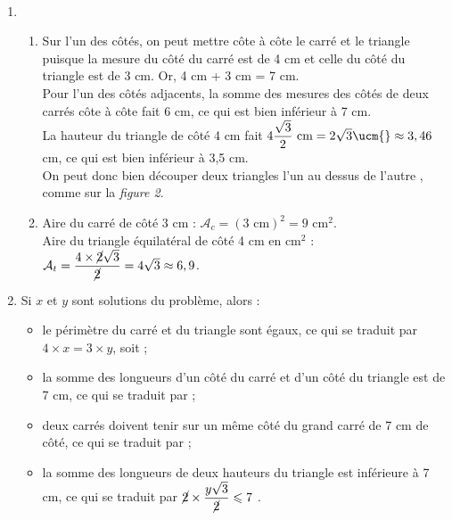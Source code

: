 \ \\ [-5mm]
\begin{enumerate}
   \item
   \begin{enumerate}
      \item Sur l'un des côtés, on peut mettre côte à côte le carré et le triangle puisque la mesure du côté du carré est de 4 cm et celle du côté du triangle est de 3 cm. Or, 4 cm + 3 cm = 7 cm. \\
      Pour l'un des côtés adjacents, la somme des mesures des côtés de deux carrés côte à côte fait 6 cm, ce qui est bien inférieur à 7 cm. \\
      La hauteur du triangle de côté 4 cm fait $4\dfrac{\sqrt3}{2}\text{ cm} =2\sqrt{3} \ucm{} \approx 3,46$ cm, ce qui est bien inférieur à 3,5 cm. \\ [1mm]
      On peut donc bien découper deux triangles \og l'un au dessus de l'autre \fg{}, comme sur la {\it figure 2}. \\
      \item Aire du carré de côté 3 cm : $\mathcal{A}_c =(3\text{ cm})^2 =9$ cm$^2$. \\
      Aire du triangle équilatéral de côté 4 cm en cm$^2$ : $\mathcal{A}_t =\dfrac{4\times\cancel{2}\sqrt3}{\cancel{2}} =4\sqrt3 \approx6,9$. \\ [1mm]
   \end{enumerate}
   \item Si $x$ et $y$ sont solutions du problème, alors :
      \begin{itemize}
         \item le périmètre du carré et du triangle sont égaux, ce qui se traduit par $4\times x =3\times y$, soit  ;
         \item la somme des longueurs d'un côté du carré et d'un côté du triangle est de 7 cm, ce qui se traduit par  ;
         \item deux carrés doivent tenir sur un même côté du grand carré de 7 cm de côté, ce qui se traduit par  ;
         \item la somme des longueurs de deux hauteurs du triangle est inférieure à 7 cm, ce qui se traduit par $\cancel{2}\times\dfrac{y\sqrt3}{\cancel{2}}\leqslant7$ .
      \end{itemize}

\end{enumerate}
